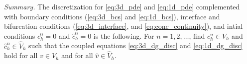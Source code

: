 \documentclass[fleqn,10pt]{wlscirep}
\begin{document}
 \textit{Summary.} The discretization for \eqref{eq:3d_pde} and \eqref{eq:1d_pde} complemented with boundary conditions (\eqref{eq:3d_bcs} and \eqref{eq:1d_bcs}), interface and bifurcation  conditions (\eqref{eq:3d_interface}, and \eqref{eq:conc_continuity}), and intial conditions $c_h^0 =0 $ and $\hat c_h^0 = 0 $ is the following. For $n = 1,2, \ldots $, find  $c_h^n \in V_h$ and $\hat c^n_h \in \hat V_h$ such that the coupled equations \eqref{eq:3d_dg_disc} and \eqref{eq:1d_dg_disc} hold for all $v \in V_h$ and for all $\hat v \in \hat V_h$. 





\end{document}
